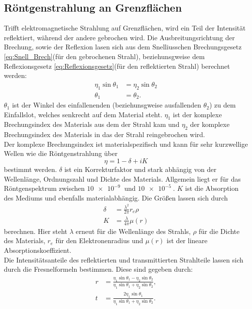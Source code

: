 \subsection{Röntgenstrahlung an Grenzflächen}

Trifft elektromagnetische Strahlung auf Grenzflächen, wird ein Teil der Intensität reflektiert, während der andere gebrochen wird. Die Ausbreitungsrichtung der Brechung,
sowie der Reflexion lasen sich aus dem Snelliusschen Brechungsgesetz \autoref{eq:Snell_Brech}(für den gebrochenen Strahl), beziehunsgweise dem Reflexionsgesetz \autoref{eq:Reflexionsgesetz}(für den reflektierten Strahl) berechnet werden:
\begin{align}
\label{eq:Snell_Brech}
    \eta_1 \sin{\theta_1} &= \eta_2 \sin{\theta_2}\\
\label{eq:Reflexionsgesetz}
    \theta_1 &= \theta_2.
\end{align}
$\theta_1$ ist der Winkel des einfallenenden (beziehunsgweise ausfallenden $\theta_2$) zu dem Einfallslot, welches senkrecht auf dem Material steht. $\eta_1$ ist der komplexe Brechungsindex des Materials aus dem der Strahl kam und
$\eta_2$ der komplexe Brechungsindex des Materials in das der Strahl reingebrochen wird.\\
Der komplexe Brechungsindex ist materialspezifisch und kann für sehr kurzwellige Wellen wie die Röntgenstrahlung über
\begin{equation}
    \label{eq:Brechungsindex}
    \eta = 1-\delta+iK
\end{equation}
bestimmt werden. $\delta$ ist ein Korrekturfaktor und stark abhängig von der Wellenlänge, Ordnungszahl und Dichte des Materials. Allgemein liegt er für das Röntgenspektrum zwischen $\qty{10e-9}{}$ und $\qty{10e-5}{}$.
$K$ ist die Absorption des Mediums und ebenfalls materialabhängig. Die Größen lassen sich durch
\begin{align}
    \delta &= \frac{\lambda^2}{2\pi}r_e\rho\\
    K &= \frac{\lambda}{4\pi}\mu(r)
\end{align}
berechnen. Hier steht $\lambda$ erneut für die Wellenlänge des Strahls, $\rho$ für die Dichte des Materials, $r_e$ für den Elektronenradius und $\mu(r)$ ist der lineare Absorptionskoeffizient.\\
Die Intensitätsanteile des reflektierten und transmittierten Strahlteile lassen sich durch die Fresnelformeln bestimmen. Diese sind gegeben durch:
\begin{align}
    r &= \frac{\eta_1 \sin{\theta_1} - \eta_2 \sin{\theta_2}}{\eta_1 \sin{\theta_1} + \eta_2 \sin{\theta_2}},\\
    t &= \frac{2\eta_1 \sin{\theta_1}}{\eta_1 \sin{\theta_1} + \eta_2 \sin{\theta_2}}.
\end{align}
